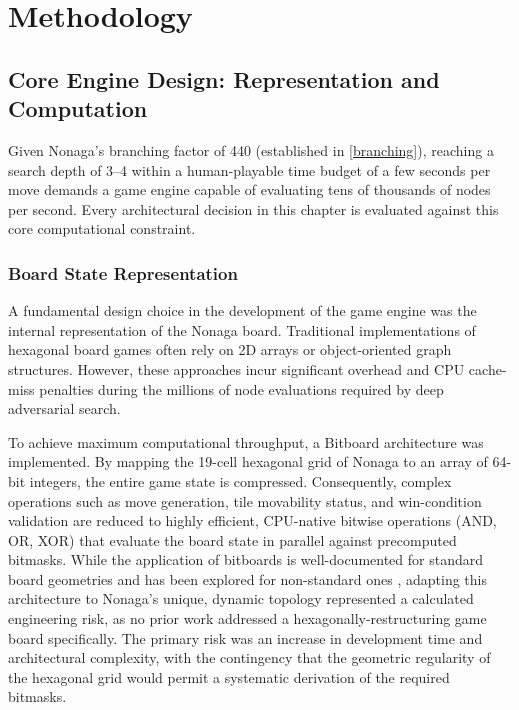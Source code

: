 
\chapter{Methodology}
\label{chapter2}
\section{Core Engine Design: Representation and Computation}
\label{sec:core_engine_design}

Given Nonaga's branching factor of 440 (established in \cref{branching}), reaching a search depth of 3--4 within a human-playable time budget of a few seconds per move demands a game engine capable of evaluating tens of thousands of nodes per second. Every architectural decision in this chapter is evaluated against this core computational constraint.

\subsection{Board State Representation}
\label{subsec:board_state_representation}
A fundamental design choice in the development of the game engine was the internal representation of the Nonaga board. Traditional implementations of hexagonal board games often rely on 2D arrays or object-oriented graph structures. However, these approaches incur significant overhead and CPU cache-miss penalties during the millions of node evaluations required by deep adversarial search.

To achieve maximum computational throughput, a Bitboard architecture was implemented. By mapping the 19-cell hexagonal grid of Nonaga to an array of 64-bit integers, the entire game state is compressed. Consequently, complex operations such as move generation, tile movability status, and win-condition validation are reduced to highly efficient, CPU-native bitwise operations (AND, OR, XOR) that evaluate the board state in parallel against precomputed bitmasks. While the application of bitboards is well-documented for standard board geometries \cite{tannous2007avoiding} and has been explored for non-standard ones \cite{browne2014bitboards}, adapting this architecture to Nonaga's unique, dynamic topology represented a calculated engineering risk, as no prior work addressed a hexagonally-restructuring game board specifically. The primary risk was an increase in development time and architectural complexity, with the contingency that the geometric regularity of the hexagonal grid would permit a systematic derivation of the required bitmasks.

